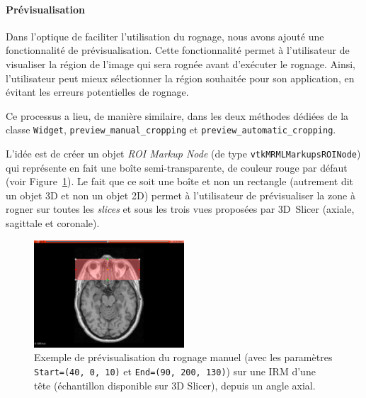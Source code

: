 \documentclass{article}
\newcommand{\subsubsubsection}[1]{\paragraph{#1}\par\noindent\bigskip}
\begin{document}
{{{            %
            {
                \bigskip
                \subsubsubsection{Prévisualisation}
                \label{subsubsubsec:cropping-preview}

                Dans l'optique de faciliter l'utilisation du rognage, nous avons ajouté une fonctionnalité de prévisualisation. Cette fonctionnalité permet à l'utilisateur de visualiser la région de l'image qui sera rognée avant d'exécuter le rognage. Ainsi, l'utilisateur peut mieux sélectionner la région souhaitée pour son application, en évitant les erreurs potentielles de rognage.

                \bigskip

                Ce processus a lieu, de manière similaire, dans les deux méthodes dédiées de la classe \texttt{Widget}, \texttt{preview\_manual\_cropping} et \texttt{preview\_automatic\_cropping}.

                L'idée est de créer un objet \textit{ROI Markup Node} (de type \texttt{vtkMRMLMarkupsROINode}) qui représente en fait une boîte semi-transparente, de couleur rouge par défaut (voir Figure~\ref{fig:cropping-preview}). Le fait que ce soit une boîte et non un rectangle (autrement dit un objet 3D et non un objet 2D) permet à l'utilisateur de prévisualiser la zone à rogner sur toutes les \textit{slices} et sous les trois vues proposées par 3D~Slicer (axiale, sagittale et coronale).

                \begin{figure}[!ht]
                    \centering
                    \includegraphics[width=0.5\textwidth]{images/cropping_preview.png}
                    \caption{Exemple de prévisualisation du rognage manuel (avec les paramètres \texttt{Start=(40, 0, 10)} et \texttt{End=(90, 200, 130)}) sur une IRM d'une tête (échantillon disponible sur 3D Slicer), depuis un angle axial.}
                    \label{fig:cropping-preview}
                \end{figure}

}}}}
\end{document}
